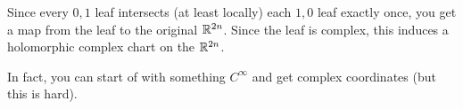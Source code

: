  Since every $0,1$ leaf intersects (at least locally) each $1,0$
 leaf exactly once, you get a map from the leaf to the original
 $\mathbb{R}^{2n}$.  Since the leaf is complex, this induces a
 holomorphic complex chart on the $\mathbb{R}^{2n}$.

 In fact, you can start of with something $C^\infty$ and get
 complex coordinates (but this is hard).
